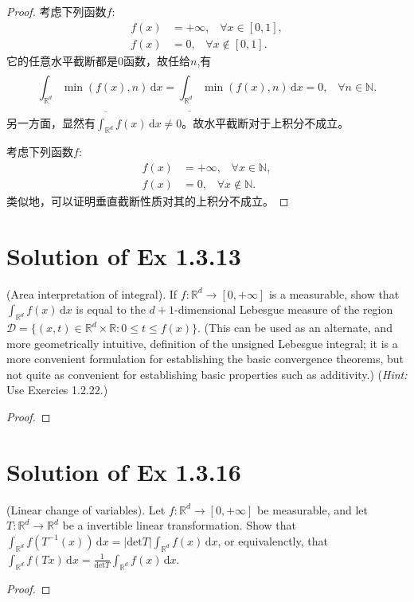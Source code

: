 \documentclass[reqno,a4paper,10pt]{amsart}
\newcommand\dif{\,\mathrm{d}}
\newcommand\Rnum{\mathbb{R}}
\newcommand{\abs}[1]{\left\vert#1\right\vert}
\begin{document}
\begin{proof}
    考虑下列函数$f$:
    \begin{equation*}
        \begin{split}
            f(x)&=+\infty,\;\;\;\forall x\in[0,1],\\
            f(x)&=0,\;\;\;\forall x\notin[0,1].
        \end{split}
    \end{equation*}
    它的任意水平截断都是0函数，故任给$n$,有
    \begin{equation*}
        \overline{\int_{\Rnum^d}}\min(f(x),n)\dif x=\underline{\int_{\Rnum^d}}\min(f(x),n)\dif x=0,\;\;\;\forall n\in\mathbb{N}.
    \end{equation*}
    另一方面，显然有$\overline{\int_{\Rnum^d}}f(x)\dif x\neq 0$。故水平截断对于上积分不成立。
    
    考虑下列函数$f$:
    \begin{equation*}
        \begin{split}
            f(x)&=+\infty,\;\;\;\forall x\in\mathbb{N},\\
            f(x)&=0,\;\;\;\forall x\notin\mathbb{N}.
        \end{split}
    \end{equation*}
    类似地，可以证明垂直截断性质对其的上积分不成立。
\end{proof}
\section{Solution of Ex 1.3.13}
(Area interpretation of integral). If $f:\Rnum^d\to[0,+\infty]$ is a measurable, show that $\int_{\Rnum^d} f(x)\dif x$ is equal to the $d+1$-dimensional Lebesgue measure of the region $\mathcal{D}=\{(x,t)\in\Rnum^d\times \Rnum:0\leq t\leq f(x)\}$. (This can be used as an alternate, and more geometrically intuitive, definition of the unsigned Lebesgue integral; it is a more convenient formulation for establishing the basic convergence theorems, but not quite as convenient for establishing basic properties such as additivity.) (\textit{Hint:} Use Exercies 1.2.22.)
\begin{proof}
    
\end{proof}




\section{Solution of Ex 1.3.16}
(Linear change of variables). Let $f:\Rnum^d\to[0,+\infty]$ be measurable, and let $T:\Rnum^d\to\Rnum^d$ be a invertible linear transformation. Show that $\int_{\Rnum^d} f(T^{-1}(x))\dif x = \abs{\mathrm{det}T}\int_{\Rnum^d} f(x)\dif x$, or equivalenctly, that $\int_{\Rnum^d} f(Tx)\dif x=\frac{1}{\mathrm{det}T}\int_{\Rnum^d} f(x)\dif x$.
\begin{proof}
    
\end{proof}
\end{document}

